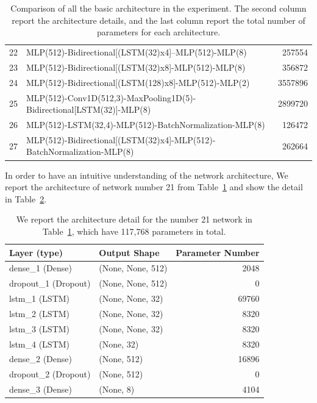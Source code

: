 \documentclass{article}
\begin{document}
\begin{table}[htbp]
\begin{tabular}{rp{32em}r}
22 & MLP(512)-Bidirectional[(LSTM(32)x4]--MLP(512)-MLP(8) & 257554 \\
23 & MLP(512)-Bidirectional[(LSTM(32)x8]-MLP(512)-MLP(8) & 356872 \\
24 & MLP(512)-Bidirectional[(LSTM(128)x8]-MLP(512)-MLP(2) & 3557896 \\
25 & MLP(512)-Conv1D(512,3)-MaxPooling1D(5)-Bidirectional[LSTM(32)]-MLP(8) & 2899720 \\
26 & MLP(512)-LSTM(32,4)-MLP(512)-BatchNormalization-MLP(8) & 126472 \\
27 & MLP(512)-Bidirectional[(LSTM(32)x4]-MLP(512)-BatchNormalization-MLP(8) & 262664 \\
\bottomrule
\end{tabular}
 \caption{Comparison of all the basic architecture in the experiment. The second column report the architecture details, and the last column report the total number of parameters for each architecture.}\label{tab:ArchitectureDetail} 
\end{table}

In order to have an intuitive understanding of the network architecture, We report the architecture of network number 21 from Table~\ref{tab:ArchitectureDetail} and show the detail in Table~\ref{tab:Architecture21Detail}.

\begin{table}[htbp]
  \centering
    \begin{tabular}{lp{9.94em}r}
    \toprule
    \textbf{Layer (type)          } & \textbf{ Output Shape        } & \multicolumn{1}{l}{\textbf{Parameter Number}} \\
    \midrule
    dense\_1 (Dense)        &  (None, None, 512)    & 2048 \\
    dropout\_1 (Dropout)    &  (None, None, 512)    & 0 \\
    lstm\_1 (LSTM)          &  (None, None, 32)     & 69760 \\
    lstm\_2 (LSTM)          &  (None, None, 32)     & 8320 \\
    lstm\_3 (LSTM)          &  (None, None, 32)     & 8320 \\
    lstm\_4 (LSTM)          &  (None, 32)           & 8320 \\
    dense\_2 (Dense)        &  (None, 512)          & 16896 \\
    dropout\_2 (Dropout)    &  (None, 512)          & 0 \\
    dense\_3 (Dense)        &  (None, 8)            & 4104 \\
    \bottomrule
    \end{tabular}%
	\vspace{1em}
     \caption{We report the architecture detail for the number 21 network in Table~\ref{tab:ArchitectureDetail}, which have 117,768 parameters in total.}\label{tab:Architecture21Detail} 
\end{table}
\end{document}
